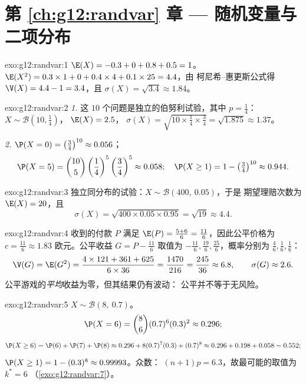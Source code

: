 \section*{第 \ref{ch:g12:randvar} 章 --- 随机变量与二项分布}

\begin{solution}{exo:g12:randvar:1}
$\E(X) = -0.3 + 0 + 0.8 + 0.5 = 1$。
$\E(X^2) = 0.3 \times 1 + 0 + 0.4\times4 + 0.1\times25 = 4.4$，由
柯尼希–惠更斯公式得 $\V(X) = 4.4 - 1 = 3.4$，且
$\sigma(X) = \sqrt{3.4} \approx 1.84$。
\end{solution}

\begin{solution}{exo:g12:randvar:2}
\emph{1.} 这 $10$ 个问题是独立的伯努利试验，其中
$p = \frac14$：$X \sim \mathcal B\left(10, \frac14\right)$，
$\E(X) = 2.5$，
$\sigma(X) = \sqrt{10 \times \frac14 \times \frac34} = \sqrt{1.875}
\approx 1.37$。

\emph{2.} $\P(X = 0) = \left(\frac34\right)^{10} \approx 0.056$；
\[
\P(X = 5) = \binom{10}{5}\left(\frac14\right)^5\left(\frac34\right)^5
\approx 0.058;
\quad
\P(X \geq 1) = 1 - \left(\tfrac34\right)^{10} \approx 0.944 .
\]
\end{solution}

\begin{solution}{exo:g12:randvar:3}
独立同分布的试验：$X \sim \mathcal B(400,\ 0.05)$，于是
期望理赔次数为 $\E(X) = 20$，且
\[
\sigma(X) = \sqrt{400 \times 0.05 \times 0.95} = \sqrt{19} \approx 4.4 .
\]
\end{solution}

\begin{solution}{exo:g12:randvar:4}
收到的付款 $P$ 满足
$\E(P) = \frac{5 + 6}{6} = \frac{11}{6}$，因此公平价格为
$c = \frac{11}{6} \approx 1.83$ 欧元。公平收益 $G = P - \frac{11}6$
取值为 $-\frac{11}{6}, \frac{19}{6}, \frac{25}{6}$，概率分别为
$\frac46, \frac16, \frac16$：
\[
\V(G) = \E(G^2)
= \frac{4 \times 121 + 361 + 625}{6 \times 36} = \frac{1470}{216}
= \frac{245}{36} \approx 6.8,
\qquad \sigma(G) \approx 2.6 .
\]
公平游戏的\emph{平均}收益为零，但其结果仍有波动：
公平并不等于无风险。
\end{solution}

\begin{solution}{exo:g12:randvar:5}
$X \sim \mathcal B(8,\ 0.7)$。
\[
\P(X = 6) = \binom86 (0.7)^6(0.3)^2 \approx 0.296 ;
\]
\[
\P(X \geq 6) = \P(6) + \P(7) + \P(8)
\approx 0.296 + 8(0.7)^7(0.3) + (0.7)^8
\approx 0.296 + 0.198 + 0.058 = 0.552 ;
\]
$\P(X \geq 1) = 1 - (0.3)^8 \approx 0.99993$。众数：
$(n+1)p = 6.3$，故最可能的取值为 $k^* = 6$
（\cref{exo:g12:randvar:7}）。
\end{solution}


